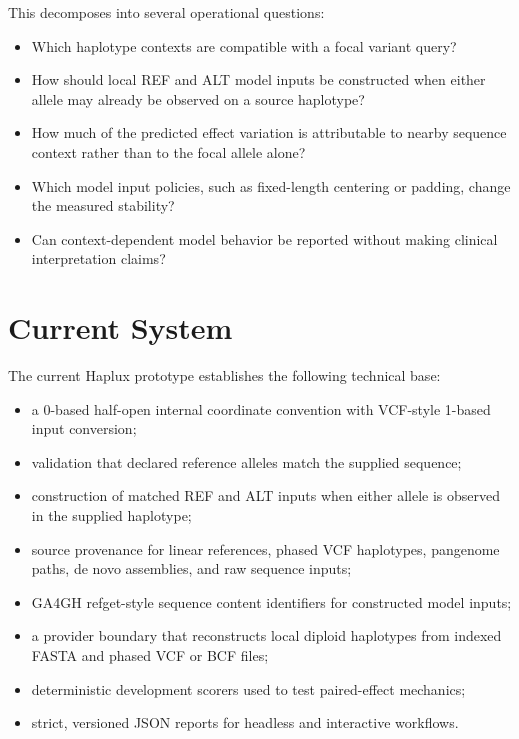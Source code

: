\documentclass[11pt]{article}
\begin{document}
This decomposes into several operational questions:

\begin{itemize}
  \item Which haplotype contexts are compatible with a focal variant query?
  \item How should local REF and ALT model inputs be constructed when either
        allele may already be observed on a source haplotype?
  \item How much of the predicted effect variation is attributable to nearby
        sequence context rather than to the focal allele alone?
  \item Which model input policies, such as fixed-length centering or padding,
        change the measured stability?
  \item Can context-dependent model behavior be reported without making clinical
        interpretation claims?
\end{itemize}

\section{Current System}

The current Haplux prototype establishes the following technical base:

\begin{itemize}
  \item a 0-based half-open internal coordinate convention with VCF-style
        1-based input conversion;
  \item validation that declared reference alleles match the supplied sequence;
  \item construction of matched REF and ALT inputs when either allele is
        observed in the supplied haplotype;
  \item source provenance for linear references, phased VCF haplotypes,
        pangenome paths, de novo assemblies, and raw sequence inputs;
  \item GA4GH refget-style sequence content identifiers for constructed model
        inputs;
  \item a provider boundary that reconstructs local diploid haplotypes from
        indexed FASTA and phased VCF or BCF files;
  \item deterministic development scorers used to test paired-effect mechanics;
  \item strict, versioned JSON reports for headless and interactive workflows.
\end{itemize}
\end{document}
